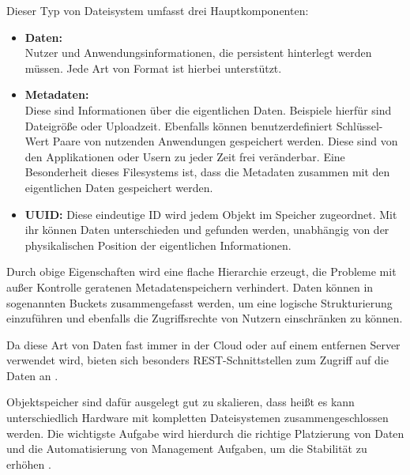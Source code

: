 Dieser Typ von Dateisystem umfasst drei Hauptkomponenten:

\begin{itemize}
	\item \textbf{Daten:}\\
	 Nutzer und Anwendungsinformationen, die persistent hinterlegt werden müssen. Jede Art von Format ist hierbei unterstützt.
	\item \textbf{Metadaten:}\\
	 Diese sind Informationen über die eigentlichen Daten. Beispiele hierfür sind Dateigröße oder Uploadzeit. Ebenfalls können benutzerdefiniert Schlüssel-Wert Paare von nutzenden Anwendungen gespeichert werden. Diese sind von den Applikationen oder Usern zu jeder Zeit frei veränderbar. Eine Besonderheit dieses Filesystems ist, dass die Metadaten zusammen mit den eigentlichen Daten gespeichert werden.
	\item \textbf{\ac{UUID}:} Diese eindeutige ID wird jedem Objekt im Speicher zugeordnet. Mit ihr können Daten unterschieden  und gefunden werden, unabhängig von der physikalischen Position der eigentlichen Informationen.
\end{itemize}

Durch obige Eigenschaften wird eine flache Hierarchie erzeugt, die Probleme mit außer Kontrolle geratenen Metadatenspeichern verhindert. Daten können in sogenannten Buckets zusammengefasst werden, um eine logische Strukturierung einzuführen und ebenfalls die Zugriffsrechte von Nutzern einschränken zu können.  

Da diese Art von Daten fast immer in der Cloud oder auf einem entfernen Server verwendet wird, bieten sich besonders REST-Schnittstellen zum Zugriff auf die Daten an \parencite[S. 4f]{Rios.2017}.

Objektspeicher sind dafür ausgelegt gut zu skalieren, dass heißt es kann unterschiedlich Hardware mit kompletten Dateisystemen zusammengeschlossen werden. Die wichtigste Aufgabe wird hierdurch die richtige Platzierung von Daten und die Automatisierung von Management Aufgaben, um die Stabilität zu erhöhen \parencite[Kap. 1, Object Storage]{varma.2015}.
